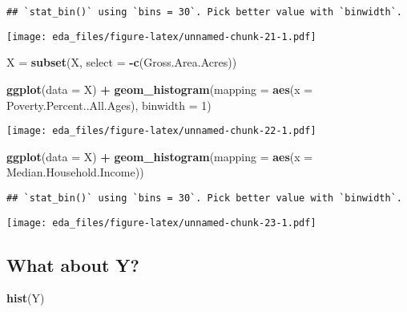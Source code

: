 \documentclass[
]{article}
\newenvironment{Shaded}{\begin{snugshade}}{\end{snugshade}}
\newcommand{\DataTypeTok}[1]{\textcolor[rgb]{0.13,0.29,0.53}{#1}}
\newcommand{\DecValTok}[1]{\textcolor[rgb]{0.00,0.00,0.81}{#1}}
\newcommand{\KeywordTok}[1]{\textcolor[rgb]{0.13,0.29,0.53}{\textbf{#1}}}
\newcommand{\NormalTok}[1]{#1}
\newcommand{\OperatorTok}[1]{\textcolor[rgb]{0.81,0.36,0.00}{\textbf{#1}}}
\newcommand{\StringTok}[1]{\textcolor[rgb]{0.31,0.60,0.02}{#1}}
\begin{document}
\begin{verbatim}
## `stat_bin()` using `bins = 30`. Pick better value with `binwidth`.
\end{verbatim}

\texttt{[image: eda\_files/figure-latex/unnamed-chunk-21-1.pdf]}

\begin{Shaded}
\begin{Highlighting}[]
\NormalTok{X =}\StringTok{ }\KeywordTok{subset}\NormalTok{(X, }\DataTypeTok{select =} \OperatorTok{-}\KeywordTok{c}\NormalTok{(Gross.Area.Acres))}
\end{Highlighting}
\end{Shaded}

\begin{Shaded}
\begin{Highlighting}[]
\KeywordTok{ggplot}\NormalTok{(}\DataTypeTok{data =}\NormalTok{ X) }\OperatorTok{+}
\StringTok{  }\KeywordTok{geom_histogram}\NormalTok{(}\DataTypeTok{mapping =} \KeywordTok{aes}\NormalTok{(}\DataTypeTok{x =}\NormalTok{ Poverty.Percent..All.Ages), }\DataTypeTok{binwidth =} \DecValTok{1}\NormalTok{)}
\end{Highlighting}
\end{Shaded}

\texttt{[image: eda\_files/figure-latex/unnamed-chunk-22-1.pdf]}

\begin{Shaded}
\begin{Highlighting}[]
\KeywordTok{ggplot}\NormalTok{(}\DataTypeTok{data =}\NormalTok{ X) }\OperatorTok{+}
\StringTok{  }\KeywordTok{geom_histogram}\NormalTok{(}\DataTypeTok{mapping =} \KeywordTok{aes}\NormalTok{(}\DataTypeTok{x =}\NormalTok{ Median.Household.Income))}
\end{Highlighting}
\end{Shaded}

\begin{verbatim}
## `stat_bin()` using `bins = 30`. Pick better value with `binwidth`.
\end{verbatim}

\texttt{[image: eda\_files/figure-latex/unnamed-chunk-23-1.pdf]}

\hypertarget{what-about-y}{%
\subsection{What about Y?}\label{what-about-y}}

\begin{Shaded}
\begin{Highlighting}[]
\KeywordTok{hist}\NormalTok{(Y)}
\end{Highlighting}
\end{Shaded}
\end{document}
